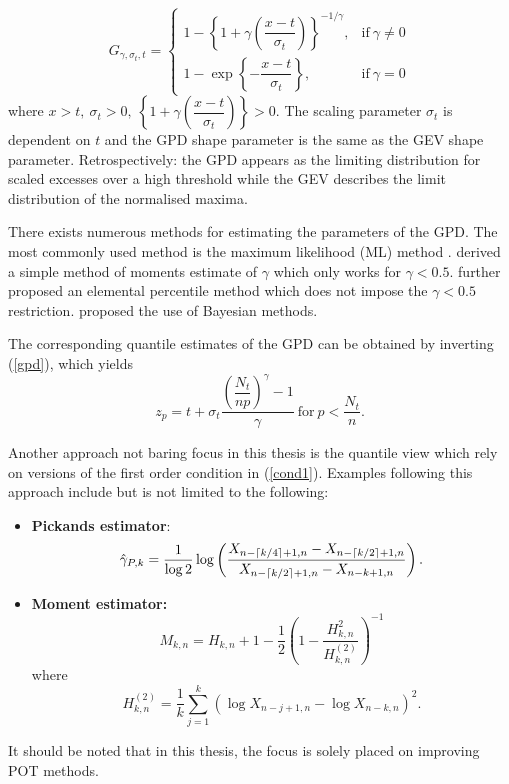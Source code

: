 \begin{equation}\label{gpd}
 G_{\gamma,\sigma_t,t} = 
\begin{cases}
 1-\left\{1+\gamma\left(\dfrac{x-t}{\sigma_t}\right)\right\}^{-1/\gamma}, & \text{if}\ \gamma\neq0 \\
 1 - \exp\left\{-\dfrac{x-t}{\sigma_t}\right\}, & \text{if}\ \gamma=0
\end{cases}
\end{equation}where $x>t,\ \sigma_t >0,\ \left\{1+\gamma\left(\dfrac{x-t}{\sigma_t}\right)\right\} > 0$. The scaling parameter $\sigma_t$ is dependent on $t$ and the GPD shape parameter is the same as the GEV shape parameter. Retrospectively: the GPD appears as the limiting distribution for scaled excesses over a high threshold while the GEV describes the limit distribution of the normalised maxima.

There exists numerous methods for estimating the parameters of the GPD. The most commonly used method is the maximum likelihood (ML) method \citep[see][]{smith1987estimating}. \cite{hosking1987parameter} derived a simple method of moments estimate of $\gamma$ which only works for $\gamma < 0.5$. \cite{castillo1997fitting} further proposed an elemental percentile method which does not impose the $\gamma < 0.5$ restriction. \cite{coles1996bayesian} proposed the use of Bayesian methods.

The corresponding quantile estimates of the GPD can be obtained by inverting (\ref{gpd}), which yields
\begin{equation}
z_p = t +\sigma_t\dfrac{\left(\dfrac{N_t}{np}\right)^{\gamma}-1}{\gamma}\ \text{for}\ p<\dfrac{N_t}{n}.
\end{equation}

Another approach not baring focus in this thesis is the quantile view which rely on versions of the first order condition in (\ref{cond1}). Examples following this approach include but is not limited to the following:
\begin{itemize}
\item \textbf{Pickands estimator}:
\begin{equation*}
\hat{\gamma}_{P,k} = \dfrac{1}{\log 2}\log \left(\dfrac{X_{n-\lceil k/4\rceil+1,n}-X_{n-\lceil k/2\rceil+1,n}}{X_{n-\lceil k/2\rceil+1,n}-X_{n-k+1,n}}\right).
\end{equation*}

\item \textbf{Moment estimator:}
\begin{equation*}
M_{k,n}=H_{k,n} + 1 - \dfrac{1}{2}\left(1-\dfrac{H^2_{k,n}}{H^{(2)}_{k,n}}\right)^{-1}
\end{equation*}where
\begin{equation*}
H^{(2)}_{k,n} = \dfrac{1}{k}\sum^k_{j=1}(\log X_{n-j+1,n} - \log X_{n-k,n})^2.
\end{equation*}

\end{itemize}
It should be noted that in this thesis, the focus is solely placed on improving POT methods.


